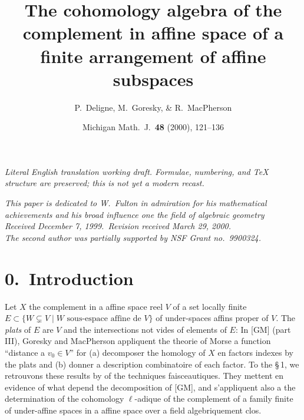\documentclass[11pt,a4paper]{article}
\theoremstyle{plain}
\theoremstyle{definition}
\begin{document}
\begin{center}\small\emph{Literal English translation working draft. Formulae, numbering, and TeX structure are preserved; this is not yet a modern recast.}\end{center}
\vspace{0.5em}


\title{The cohomology algebra of the complement in affine space of a finite arrangement of affine subspaces}
\author{P.~Deligne, M.~Goresky, \& R.~MacPherson}
\date{\small Michigan Math.~J.\ \textbf{48} (2000), 121--136}
\maketitle

\begin{center}
\textit{This paper is dedicated to W.~Fulton in admiration for his mathematical}\\
\textit{achievements and his broad influence one the field of algebraic geometry}\\
\textit{Received December 7, 1999.\ Revision received March 29, 2000.}\\
\textit{The second author was partially supported by NSF Grant no.\ 9900324.}
\end{center}

\section*{0.\ Introduction}

Let $X$ the complement in a affine space reel $V$ of a set locally finite $E \subset \{W \subsetneq V \mid W \text{ sous-espace affine de } V\}$ of under-spaces affins proper of $V$. The \emph{plats} of $E$ are $V$ and the intersections not vides of elements of $E$:
In [GM] (part III), Goresky and MacPherson appliquent the theorie of Morse a function ``distance a $v_0 \in V$'' for (a) decomposer the homology of $X$ en factors indexes by the plats and (b) donner a description combinatoire of each factor. To the \S\,1, we retrouvons these results by of the techniques faisceautiques. They mettent en evidence of what depend the decomposition of [GM], and s'appliquent also a the determination of the cohomology $\ell$-adique of the complement of a family finite of under-affine spaces in a affine space over a field algebriquement clos.
\end{document}
